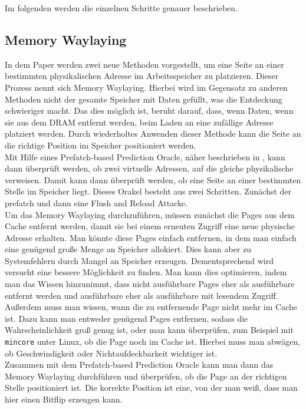 \documentclass[conference]{IEEEtran}
\begin{document}
Im folgenden werden die einzelnen Schritte genauer beschrieben.

\subsection{Memory Waylaying}
In dem Paper werden zwei neue Methoden vorgestellt, um eine Seite an einer bestimmten physikalischen Adresse im Arbeitsspeicher zu platzieren. Dieser Prozess nennt sich Memory Waylaying. Hierbei wird im Gegensatz zu anderen Methoden nicht der gesamte Speicher mit Daten gefüllt, was die Entdeckung schwieriger macht. Das dies möglich ist, beruht darauf, dass, wenn Daten, wenn sie aus dem DRAM entfernt werden, beim Laden an eine zufällige Adresse platziert werden. Durch wiederholtes Anwenden dieser Methode kann die Seite an die richtige Position im Speicher positioniert werden.\\
 Mit Hilfe eines Prefatch-based Prediction Oracle, näher beschrieben in \cite{DBLP:conf/ccs/2016}, kann dann überprüft werden, ob zwei virtuelle Adressen, auf die gleiche physikalische verweisen. Damit kann dann überprüft werden, ob eine Seite an einer bestimmten Stelle im Speicher liegt. Dieses Orakel besteht aus zwei Schritten. Zunächst der prefatch und dann eine Flush and Reload Attacke. \\
Um das Memory Waylaying durchzuführen, müssen zunächst die Pages aus dem Cache entfernt werden, damit sie bei einem erneuten Zugriff eine neue physische Adresse erhalten. Man könnte diese Pages einfach entfernen, in dem man einfach eine genügend große Menge an Speicher allokiert. Dies kann aber zu Systemfehlern durch Mangel an Speicher erzeugen. Dementsprechend wird versucht eine bessere Möglichkeit zu finden. Man kann dies optimieren, indem man das Wissen hinzunimmt, dass nicht ausführbare Pages eher als ausführbare entfernt werden und ausführbare eher als ausführbare mit lesendem Zugriff. Außerdem muss man wissen, wann die zu entfernende Page nicht mehr im Cache ist. Dazu kann man entweder genügend Pages entfernen, sodass die Wahrscheinlichkeit groß genug ist, oder man kann überprüfen, zum Beispiel mit \texttt{mincore} unter Linux, ob die Page noch im Cache ist. Hierbei muss man abwägen, ob Geschwindigkeit oder Nichtaufdeckbarkeit wichtiger ist.\\
Zusammen mit dem Prefatch-based Prediction Oracle kann man dann das Memory Waylaying durchführen und überprüfen, ob die Page an der richtigen Stelle positioniert ist. Die korrekte Position ist eine, von der man weiß, dass man hier einen Bitflip erzeugen kann.\\
\end{document}
